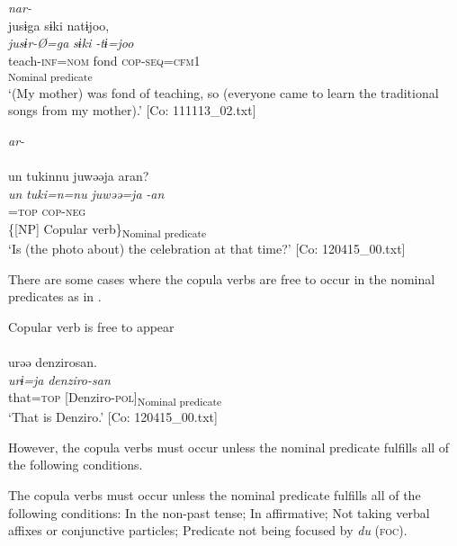 \ex  \textit{nar-}\\
\gllll   jusɨga  sɨki  natɨjoo,\\
      \textit{jusɨr-Ø=ga}  \textit{sɨki}  \textit{-tɨ=joo}\\
      teach-\textsc{inf}=\textsc{nom}  fond  \textsc{cop}-\textsc{seq}=\textsc{cfm}1\\
        [NP  Copular verb]\textsubscript{Nominal predicate}\\
      \glt       ‘(My mother) was fond of teaching, so (everyone came to learn the traditional songs from my mother).’ [Co: 111113\_02.txt]

\ex  \textit{ar-}\\\\
\gllll     un  tukinnu  juwəəja  aran?\\
      \textit{un}  \textit{tuki=n=nu}  \textit{juwəə=ja}  \textit{-an}\\
      [that  time=\textsc{dat}1=\textsc{gen}  celebration]=\textsc{top}  \textsc{cop}-\textsc{neg}\\
      \{[NP]  Copular verb\}\textsubscript{Nominal predicate}\\
      \glt       ‘Is (the photo about) the celebration at that time?’ [Co: 120415\_00.txt]
    \z
\z

There are some cases where the copula verbs are free to occur in the nominal predicates as in .

\ea  Copular verb is free to appear \label{ex:4.14}\\\\
\glll    urəə  denzirosan.\\
    \textit{urɨ=ja}  \textit{denziro-san}\\
    that=\textsc{top}  [Denziro-\textsc{pol}]\textsubscript{Nominal predicate}\\
    \glt     ‘That is Denziro.’ [Co: 120415\_00.txt]
\z

However, the copula verbs must occur unless the nominal predicate fulfills all of the following conditions.

\ea  The copula verbs must occur unless the nominal predicate fulfills all of the following conditions: \label{ex:4.15}
  \ea  In the non-past tense;
  \ex  In affirmative;
  \ex  Not taking verbal affixes or conjunctive particles;
  \ex  Predicate not being focused by \textit{du} (\textsc{foc}).
  \z
\z

